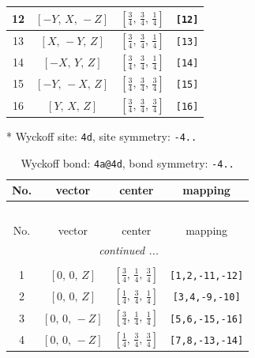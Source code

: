 \documentclass[fleqn,8pt]{jsarticle}
\begin{document}
\begin{longtable}{cccc}
12 & $\left[ - Y,\, X,\, - Z \right]$ & $\left[ \frac{3}{4},\, \frac{3}{4},\, \frac{1}{4} \right]$ & {\tt [12]} \\ \hline
13 & $\left[ X,\, - Y,\, Z \right]$ & $\left[ \frac{3}{4},\, \frac{3}{4},\, \frac{1}{4} \right]$ & {\tt [13]} \\ \hline
14 & $\left[ - X,\, Y,\, Z \right]$ & $\left[ \frac{3}{4},\, \frac{3}{4},\, \frac{1}{4} \right]$ & {\tt [14]} \\ \hline
15 & $\left[ - Y,\, - X,\, Z \right]$ & $\left[ \frac{3}{4},\, \frac{3}{4},\, \frac{3}{4} \right]$ & {\tt [15]} \\ \hline
16 & $\left[ Y,\, X,\, Z \right]$ & $\left[ \frac{3}{4},\, \frac{3}{4},\, \frac{3}{4} \right]$ & {\tt [16]} \\
\end{longtable}
* Wyckoff site: {\tt 4d}, site symmetry: {\tt -4..}
\renewcommand{\arraystretch}{1.2}
\begin{longtable}{cccc}
\caption{Wyckoff bond: {\tt 4a@4d}, bond symmetry: {\tt -4..}}
 \\
 \hline \hline
No. & vector & center & mapping \\ \hline \endfirsthead

\multicolumn{3}{l}{\tablename\ \thetable{}} \\
 \hline \hline
No. & vector & center & mapping \\ \hline \endhead

 \hline \hline
\multicolumn{3}{r}{\footnotesize\it continued ...} \\ \endfoot

 \hline \hline
\multicolumn{3}{r}{} \\ \endlastfoot

1 & $\left[ 0,\, 0,\, Z \right]$ & $\left[ \frac{3}{4},\, \frac{1}{4},\, \frac{3}{4} \right]$ & {\tt [1,2,-11,-12]} \\ \hline
2 & $\left[ 0,\, 0,\, Z \right]$ & $\left[ \frac{1}{4},\, \frac{3}{4},\, \frac{1}{4} \right]$ & {\tt [3,4,-9,-10]} \\ \hline
3 & $\left[ 0,\, 0,\, - Z \right]$ & $\left[ \frac{3}{4},\, \frac{1}{4},\, \frac{1}{4} \right]$ & {\tt [5,6,-15,-16]} \\ \hline
4 & $\left[ 0,\, 0,\, - Z \right]$ & $\left[ \frac{1}{4},\, \frac{3}{4},\, \frac{3}{4} \right]$ & {\tt [7,8,-13,-14]} \\
\end{longtable}
\renewcommand{\arraystretch}{1.2}
\end{document}

